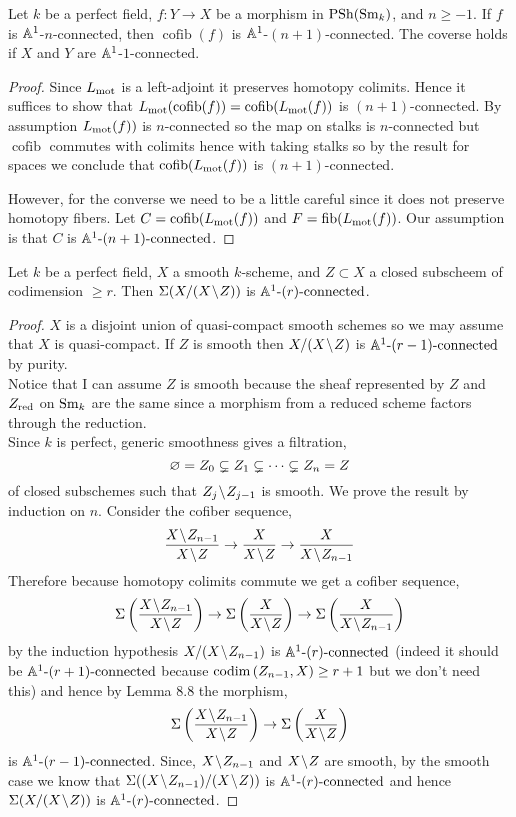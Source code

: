 \documentclass[12pt]{article}
\DeclareMathOperator{\fib}{\mathrm{fib}}
\DeclareMathOperator{\cofib}{\mathrm{cofib}}
\begin{document}
\begin{lemma}
Let $k$ be a perfect field, $f : Y \to X$ be a morphism in $\mathrm{PSh}(\mathrm{Sm}_k)$, and $n \ge -1$. If $f$ is $\mathbb{A}^1$-$n$-connected, then $\cofib(f)$ is $\mathbb{A}^1$-$(n+1)$-connected. The coverse holds if $X$ and $Y$ are $\mathbb{A}^1$-$1$-connected.
\end{lemma}

\begin{proof}
Since $L_{\text{mot}}$ is a left-adjoint it preserves homotopy colimits. Hence it suffices to show that $L_{\mot}(\cofib(f)) = \cofib(L_{\mot}(f))$ is $(n+1)$-connected. By assumption $L_{\text{mot}}(f))$ is $n$-connected so the map on stalks is $n$-connected but $\cofib$ commutes with colimits hence with taking stalks so by the result for spaces we conclude that $\cofib(L_{\mot}(f))$ is $(n+1)$-connected.
\par 
However, for the converse we need to be a little careful since it does not preserve homotopy fibers. Let $C = \cofib(L_{\mot}(f))$ and $F = \fib(L_{\mot}(f))$. Our assumption is that $C$ is $\mathbb{A}^1\text{-}(n+1)\text{-connected}$. 
\end{proof}




\begin{lemma}[8.9]
Let $k$ be a perfect field, $X$ a smooth $k$-scheme, and $Z \subset X$ a closed subscheem of codimension $\ge r$. Then $\Sigma(X/(X \! \setminus \! Z))$ is $\mathbb{A}^1\text{-}(r)\text{-connected}$. 
\end{lemma}

\begin{proof}
$X$ is a disjoint union of quasi-compact smooth schemes so we may assume that $X$ is quasi-compact. If $Z$ is smooth then $X / (X \! \setminus \! Z)$ is $\mathbb{A}^1\text{-}(r-1)\text{-connected}$ by purity.
\bigskip\\
Notice that I can assume $Z$ is smooth because the sheaf represented by $Z$ and $Z_{\mathrm{red}}$ on $\mathrm{Sm}_k$ are the same since a morphism from a reduced scheme factors through the reduction.
\bigskip\\
Since $k$ is perfect, generic smoothness gives a filtration,
\[ \varnothing = Z_0 \subsetneq Z_1 \subsetneq \cdots \subsetneq Z_n = Z \]
of closed subschemes such that $Z_j \! \setminus \! Z_{j-1}$ is smooth. We prove the result by induction on $n$. Consider the cofiber sequence,
\[ \frac{X \sm Z_{n-1}}{X \sm Z} \to \frac{X}{X \sm Z} \to \frac{X}{X \sm Z_{n-1}} \]
Therefore because homotopy colimits commute we get a cofiber sequence,
\[ \Sigma \left( \frac{X \sm Z_{n-1}}{X \sm Z} \right) \to \Sigma \left( \frac{X}{X \sm Z} \right) \to \Sigma \left( \frac{X}{X \sm Z_{n-1}} \right) \]
by the induction hypothesis $X / (X \! \setminus \! Z_{n-1})$ is $\mathbb{A}^1\text{-}(r)\text{-connected}$ (indeed it should be $\mathbb{A}^1\text{-}(r+1)\text{-connected}$ because $\mathrm{codim}\left( Z_{n-1}, X \right) \ge r + 1$ but we don't need this) and hence by Lemma 8.8 the morphism,
\[ \Sigma \left( \frac{X \! \setminus \! Z_{n-1}}{X \! \setminus \! Z} \right) \to \Sigma \left( \frac{X}{X \! \setminus \! Z} \right)  \]
is $\mathbb{A}^1\text{-}(r-1)\text{-connected}$. Since, $X \! \setminus \! Z_{n-1}$ and $X \! \setminus \! Z$ are smooth, by the smooth case we know that $\Sigma ((X \! \setminus \! Z_{n-1})/(X \! \setminus \! Z))$ is $\mathbb{A}^1\text{-}(r)\text{-connected}$ and hence $\Sigma( X / (X \! \setminus \! Z))$ is $\mathbb{A}^1\text{-}(r)\text{-connected}$.
\end{proof}
\end{document}
